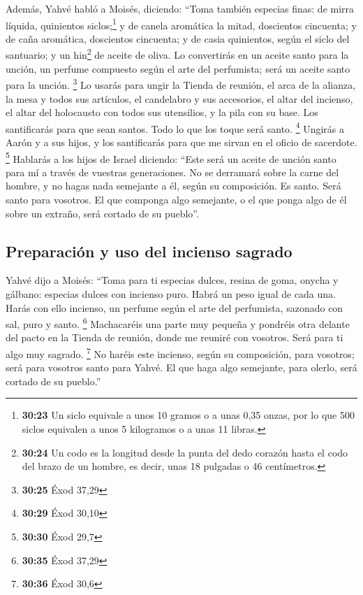 Además, Yahvé habló a Moisés, diciendo: 
``Toma también especias finas: de mirra líquida, quinientos
siclos;\footnote{\textbf{30:23} Un siclo equivale a unos 10 gramos o a
  unas 0,35 onzas, por lo que 500 siclos equivalen a unos 5 kilogramos o
  a unas 11 libras.} y de canela aromática la mitad, doscientos
cincuenta; y de caña aromática, doscientos cincuenta;  y
de casia quinientos, según el siclo del santuario; y un hin\footnote{\textbf{30:24}
  Un codo es la longitud desde la punta del dedo corazón hasta el codo
  del brazo de un hombre, es decir, unas 18 pulgadas o 46 centímetros.}
de aceite de oliva.  Lo convertirás en un aceite santo
para la unción, un perfume compuesto según el arte del perfumista; será
un aceite santo para la unción. \footnote{\textbf{30:25} Éxod 37,29}
 Lo usarás para ungir la Tienda de reunión, el arca de la
alianza,  la mesa y todos sus artículos, el candelabro y
sus accesorios, el altar del incienso,  el altar del
holocausto con todos sus utensilios, y la pila con su base.
 Los santificarás para que sean santos. Todo lo que los
toque será santo. \footnote{\textbf{30:29} Éxod 30,10} 
Ungirás a Aarón y a sus hijos, y los santificarás para que me sirvan en
el oficio de sacerdote. \footnote{\textbf{30:30} Éxod 29,7}
 Hablarás a los hijos de Israel diciendo: ``Este será un
aceite de unción santo para mí a través de vuestras generaciones.
 No se derramará sobre la carne del hombre, y no hagas
nada semejante a él, según su composición. Es santo. Será santo para
vosotros.  El que componga algo semejante, o el que ponga
algo de él sobre un extraño, será cortado de su pueblo''.

\hypertarget{preparaciuxf3n-y-uso-del-incienso-sagrado}{%
\subsection{Preparación y uso del incienso
sagrado}\label{preparaciuxf3n-y-uso-del-incienso-sagrado}}

 Yahvé dijo a Moisés: ``Toma para ti especias dulces,
resina de goma, onycha y gálbano: especias dulces con incienso puro.
Habrá un peso igual de cada una.  Harás con ello
incienso, un perfume según el arte del perfumista, sazonado con sal,
puro y santo. \footnote{\textbf{30:35} Éxod 37,29} 
Machacaréis una parte muy pequeña y pondréis otra delante del pacto en
la Tienda de reunión, donde me reuniré con vosotros. Será para ti algo
muy sagrado. \footnote{\textbf{30:36} Éxod 30,6}  No
haréis este incienso, según su composición, para vosotros; será para
vosotros santo para Yahvé.  El que haga algo semejante,
para olerlo, será cortado de su pueblo.''

